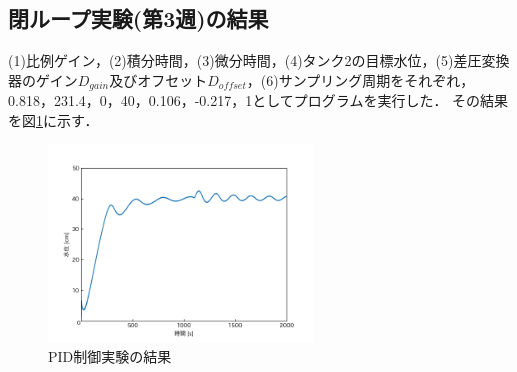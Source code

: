 \documentclass[12pt]{jsarticle}
\begin{document}
\subsection{閉ループ実験(第3週)の結果}
(1)比例ゲイン，(2)積分時間，(3)微分時間，(4)タンク2の目標水位，(5)差圧変換器のゲイン$D_{gain}$及びオフセット$D_{offset}$，(6)サンプリング周期をそれぞれ，0.818，231.4，0，40，0.106，-0.217，1としてプログラムを実行した．
その結果を図\ref{PIDExp}に示す．
\begin{figure}[htb]
  \begin{center}
    \includegraphics[clip, width=7.0cm]{../graph/PID_controll.png}
    \caption{PID制御実験の結果}
    \label{PIDExp}
  \end{center}
\end{figure}

\setcounter{equation}{38}
\end{document}
